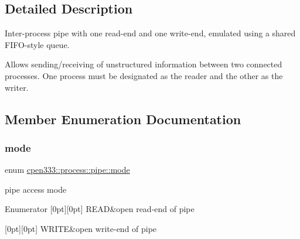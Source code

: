\subsection{Detailed Description}
Inter-\/process pipe with one read-\/end and one write-\/end, emulated using a shared F\+I\+F\+O-\/style queue. 

Allows sending/receiving of unstructured information between two connected processes. One process must be designated as the reader and the other as the writer. 

\subsection{Member Enumeration Documentation}
\mbox{\label{classcpen333_1_1process_1_1pipe_a80047f44ba5638538b032efa851c6f3c}} 
\subsubsection{\texorpdfstring{mode}{mode}}
{\footnotesize\ttfamily enum \hyperlink{classcpen333_1_1process_1_1pipe_a80047f44ba5638538b032efa851c6f3c}{cpen333\+::process\+::pipe\+::mode}}



pipe access mode 

\begin{DoxyEnumFields}{Enumerator}
[0pt][0pt]{}\mbox{\label{classcpen333_1_1process_1_1pipe_a80047f44ba5638538b032efa851c6f3ca683aa54088bc99c7fe5143db2db483fb}} 
R\+E\+AD&open read-\/end of pipe \\
\hline

[0pt][0pt]{}\mbox{\label{classcpen333_1_1process_1_1pipe_a80047f44ba5638538b032efa851c6f3caf7d3bc474155ae5295e3b8f0873e83fe}} 
W\+R\+I\+TE&open write-\/end of pipe \\
\hline

\end{DoxyEnumFields}


